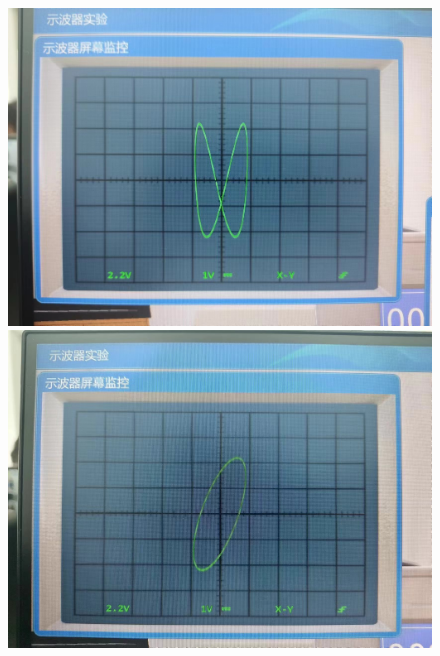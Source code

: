\documentclass[signature=data]{physicsreport}
\begin{document}
\begin{figure}[htbp]
    \centering
    \begin{minipage}[t]{0.3\textwidth}
        \centering
        \includegraphics[width=\textwidth]{images/lab6/image1.jpg}
        \caption{}
    \end{minipage}
    \hfill
    \begin{minipage}[t]{0.3\textwidth}
        \centering
        \includegraphics[width=\textwidth]{images/lab6/image2.jpg}
        \caption{}
    \end{minipage}
    \hfill
    \begin{minipage}[t]{0.3\textwidth}
        \centering

\end{minipage}
\end{figure}
\end{document}
